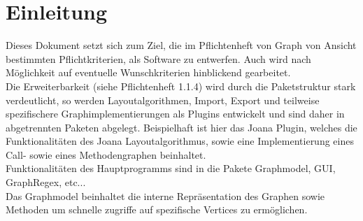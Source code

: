 \chapter{Einleitung}
\label{ch:einleitung}

Dieses Dokument setzt sich zum Ziel, die im Pflichtenheft von Graph von Ansicht bestimmten Pflichtkriterien, als Software zu entwerfen. Auch wird nach Möglichkeit auf eventuelle Wunschkriterien hinblickend gearbeitet.\\
Die Erweiterbarkeit (siehe Pflichtenheft 1.1.4) wird durch die Paketstruktur stark verdeutlicht, so werden Layoutalgorithmen, Import, Export und teilweise spezifischere Graphimplementierungen als Plugins entwickelt und sind daher in abgetrennten Paketen abgelegt. Beispielhaft ist hier das Joana Plugin, welches die Funktionalitäten des Joana Layoutalgorithmus, sowie eine Implementierung eines Call- sowie eines Methodengraphen beinhaltet.\\
Funktionalitäten des Hauptprogramms sind in die Pakete Graphmodel, GUI, GraphRegex, etc...\\ %
Das Graphmodel beinhaltet die interne Repräsentation des Graphen sowie Methoden um schnelle zugriffe auf spezifische Vertices zu ermöglichen.
